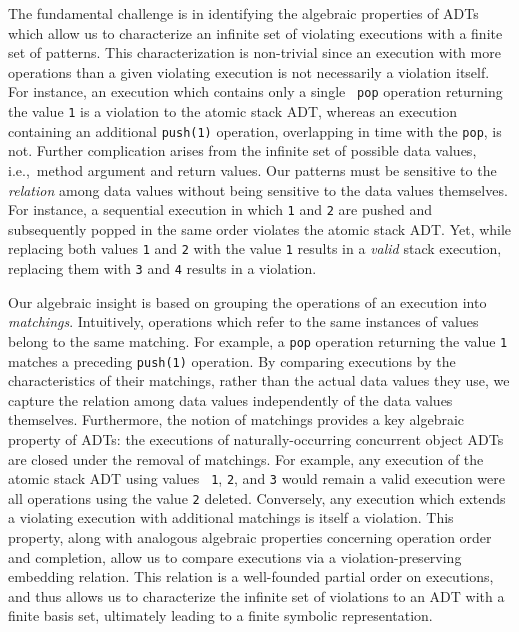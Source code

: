 The fundamental challenge is in identifying the algebraic properties of ADTs
which allow us to characterize an infinite set of violating executions with a
finite set of patterns. This characterization is non-trivial since an execution
with more operations than a given violating execution is not necessarily a
violation itself. For instance, an execution which contains only a single {\tt
pop} operation returning the value {\tt 1} is a violation to the atomic stack
ADT, whereas an execution containing an additional {\tt push(1)} operation,
overlapping in time with the {\tt pop}, is not. Further complication arises
from the infinite set of possible data values, i.e.,~method argument and return
values. Our patterns must be sensitive to the \emph{relation} among data values
without being sensitive to the data values themselves. For instance, a
sequential execution in which {\tt 1} and {\tt 2} are pushed and subsequently
popped in the same order violates the atomic stack ADT. Yet, while replacing
both values {\tt 1} and {\tt 2} with the value {\tt 1} results in a
\emph{valid} stack execution, replacing them with {\tt 3} and {\tt 4} results
in a violation.

Our algebraic insight is based on grouping the operations of an execution into
\emph{matchings}. Intuitively, operations which refer to the same instances of
values belong to the same matching. For example, a {\tt pop} operation
returning the value {\tt 1} matches a preceding {\tt push(1)} operation. By
comparing executions by the characteristics of their matchings, rather than the
actual data values they use, we capture the relation among data values
independently of the data values themselves. Furthermore, the notion of
matchings provides a key algebraic property of ADTs: the executions of
naturally-occurring concurrent object ADTs are closed under the removal of
matchings. For example, any execution of the atomic stack ADT using values {\tt
1}, {\tt 2}, and {\tt 3} would remain a valid execution were all operations
using the value {\tt 2} deleted. Conversely, any execution which extends a
violating execution with additional matchings is itself a violation. This
property, along with analogous algebraic properties concerning operation order
and completion, allow us to compare executions via a violation-preserving
embedding relation. This relation is a well-founded partial order on
executions, and thus allows us to characterize the infinite set of violations
to an ADT with a finite basis set, ultimately leading to a finite symbolic
representation.

